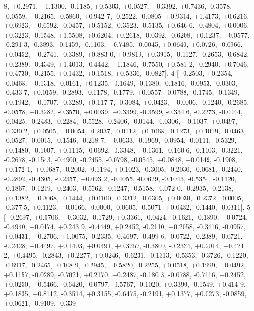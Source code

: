 \begin{DoxyCode}
      8, +0.2971, +1.1300, -0.1185, +0.5303, +0.0527, +0.3392, +0.7436, -0.3578, -0.0559, +0.2165, -0.5860, +0.942
      7, -0.2522, -0.0805, +0.9314, +1.4173, +0.6216, +0.6923, +0.6592, -0.0457, +0.5152, -0.3523, -0.5135, +0.646
      6, -0.4804, +0.0006, +0.3223, -0.1548, +1.5508, +0.6204, +0.2618, -0.0392, -0.6208, +0.0237, +0.0577, -0.291
      3, -0.3893, -0.1459, -0.1103, +0.7485, -0.0045, +0.0640, +0.0726, -0.0966, +0.0452, +0.2741, -0.3389, +0.883
      0, +0.9819, +0.3915, -0.1127, -0.2653, -0.6842, +0.2389, -0.4349, +1.4013, -0.4442, +1.1846, -0.7550, +0.581
      2, -0.2940, +0.7046, +0.4730, -0.2155, +0.1432, +0.1518, +0.5336, -0.0827],
4 [ -0.2503, +0.2354, -0.0468, +0.1318, -0.0161, +0.1235, -0.1649, -0.1380, -0.1816, -0.0953, -0.0303, -0.433
      7, +0.0159, -0.2893, -0.1178, -0.1779, +0.0557, -0.0788, -0.1745, -0.1349, +0.1942, +0.1707, -0.3289, +0.117
      7, -0.3084, +0.0423, +0.0006, -0.1240, -0.2685, -0.0578, +0.3282, -0.3570, +0.0039, +0.3399, -0.3599, -0.334
      6, -0.2273, -0.0044, -0.0425, -0.2483, -0.2284, -0.5528, -0.2406, -0.0144, -0.0306, +0.1037, +0.0497, -0.330
      2, +0.0505, +0.0054, -0.2037, -0.0112, +0.1068, -0.1273, +0.1019, -0.0463, -0.0527, -0.0015, -0.1546, -0.218
      7, +0.0633, -0.1969, -0.0954, -0.0111, -0.5329, +0.1480, -0.1007, +0.1115, -0.0692, -0.3348, +0.1361, -0.160
      6, -0.1103, -0.3221, -0.2678, -0.1543, -0.4900, -0.2455, -0.0798, -0.0545, +0.0848, +0.0149, -0.1908, +0.172
      1, +0.0687, -0.2002, -0.1194, +0.1023, -0.3005, -0.2030, -0.0681, -0.2440, -0.2892, -0.4305, -0.2357, +0.093
      2, -0.4055, -0.0629, -0.1043, -0.5354, -0.1120, -0.1867, -0.1219, -0.2403, -0.5562, -0.1247, -0.5158, -0.072
      0, -0.2935, -0.2138, +0.1382, +0.3068, -0.1444, +0.0100, -0.3312, -0.6305, +0.0030, -0.2372, -0.0005, -0.377
      5, +0.1123, +0.0166, -0.0000, -0.0605, -0.5071, +0.0482, -0.1440, -0.0311],
5 [ -0.2697, +0.0706, +0.3032, -0.1729, +0.3361, -0.0424, -0.1621, -0.1890, +0.0724, -0.4940, +0.0174, +0.243
      9, -0.4449, +0.2452, -0.2110, +0.2058, -0.3416, -0.0957, +0.0431, +0.2706, +0.0075, -0.2335, -0.4697, -0.499
      6, -0.0722, -0.2389, -0.0721, -0.2428, +0.4497, +0.1403, +0.0491, +0.3252, -0.3800, -0.2324, +0.2014, +0.421
      2, +0.4495, -0.2843, +0.2277, +0.0246, -0.6231, -0.1313, -0.5353, -0.3726, -0.1220, -0.6917, -0.2465, -0.108
      9, -0.2945, +0.5820, -0.2255, +0.0518, +0.1999, +0.0492, +0.1157, -0.0289, -0.7021, +0.2170, +0.2487, -0.180
      3, -0.0788, -0.7116, +0.2452, +0.0250, +0.5466, -0.6420, -0.0797, -0.5767, -0.1020, +0.3390, -0.1549, +0.414
      9, +0.1835, +0.8112, -0.3514, +0.3155, -0.6475, -0.2191, +0.1377, +0.0273, -0.0859, +0.0621, -0.9109, -0.339

\end{DoxyCode}
